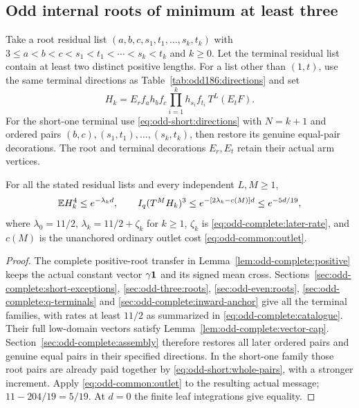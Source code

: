 \subsection{Odd internal roots of minimum at least three}
\label{proof:Q5-C189}

Take a root residual list
$(a,b,c,s_1,t_1,\ldots,s_k,t_k)$ with
$3\le a<b<c<s_1<t_1<\cdots<s_k<t_k$ and $k\ge0$.
Let the terminal residual list contain at least two distinct positive
lengths. For a list other than $(1,t)$, use the same
terminal directions as Table~\ref{tab:odd186:directions} and set
\[
 H_k=E_r f_a h_bf_c\prod_{i=1}^kh_{s_i}f_{t_i}\,
                   T^L(E_tF).
\]
For the short-one terminal use
\eqref{eq:odd-short:directions} with $N=k+1$ and ordered pairs
$(b,c),(s_1,t_1),\ldots,(s_k,t_k)$, then restore its genuine
equal-pair decorations. The root and terminal decorations
$E_r,E_t$ retain their actual arm vertices.

\begin{proposition}\label{prop:odd-complete:positive-root}
For all the stated residual lists and every independent $L,M\ge1$,
\[
 \mathbb E H_k^4\le e^{-\lambda_k d},\qquad
 I_q(T^MH_k)^3\le e^{-[2\lambda_k-c(M)]d}\le e^{-5d/19},
\]
where $\lambda_0=11/2$, $\lambda_k=11/2+\zeta_k$ for $k\ge1$,
$\zeta_k$ is \eqref{eq:odd-complete:later-rate}, and $c(M)$ is
the unanchored ordinary outlet cost \eqref{eq:odd-common:outlet}.
\end{proposition}
\begin{proof}
The complete positive-root transfer in
Lemma~\ref{lem:odd-complete:positive} keeps the actual constant
vector $\gamma\mathbf1$ and its signed mean cross.
Sections~\ref{sec:odd-complete:short-exceptions},
\ref{sec:odd-three:roots}, \ref{sec:odd-even:roots},
\ref{sec:odd-complete:q-terminals} and
\ref{sec:odd-complete:inward-anchor} give all the terminal
families, with rates at least $11/2$ as summarized in
\eqref{eq:odd-complete:catalogue}.
Their full low-domain vectors satisfy
Lemma~\ref{lem:odd-complete:vector-cap}.
Section~\ref{sec:odd-complete:assembly} therefore restores all
later ordered pairs and genuine equal pairs in their specified
directions. In the short-one family those root pairs are already
paid together by \eqref{eq:odd-short:whole-pairs}, with a stronger
increment. Apply \eqref{eq:odd-common:outlet} to the resulting
actual message; $11-204/19=5/19$.
At $d=0$ the finite leaf integrations give equality.
\end{proof}
